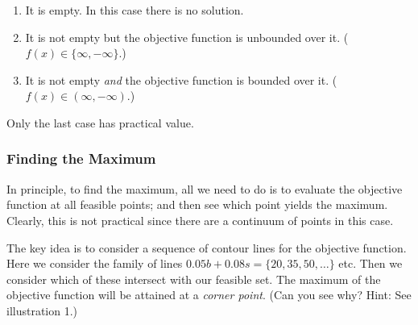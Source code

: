 \documentclass[11pt,]{article}
\providecommand{\tightlist}{%
  \setlength{\itemsep}{0pt}\setlength{\parskip}{0pt}}
\begin{document}
\begin{enumerate}
\def\labelenumi{\arabic{enumi}.}
\tightlist
\item
  It is empty. In this case there is no solution.
\item
  It is not empty but the objective function is unbounded over it.
  (\(f(x)\in\{\infty,-\infty\}\).)
\item
  It is not empty \emph{and} the objective function is bounded over it.
  (\(f(x)\in (\infty,-\infty)\).)
\end{enumerate}

Only the last case has practical value.

\subsubsection{Finding the Maximum}\label{finding-the-maximum}

In principle, to find the maximum, all we need to do is to evaluate the
objective function at all feasible points; and then see which point
yields the maximum. Clearly, this is not practical since there are a
continuum of points in this case.

The key idea is to consider a sequence of contour lines for the
objective function. Here we consider the family of lines
\(0.05b + 0.08s = \{20,35,50,\hdots\}\) etc. Then we consider which of
these intersect with our feasible set. The maximum of the objective
function will be attained at a \emph{corner point}. (Can you see why?
Hint: See illustration 1.)
\end{document}
